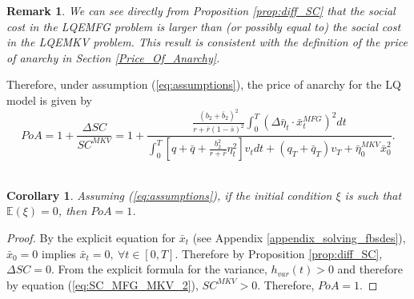 \documentclass[11pt]{article}
\newtheorem{remark}{Remark}
\newtheorem{corollary}{Corollary}
\begin{document}
\begin{remark}
	We can see directly from Proposition \ref{prop:diff_SC} that the social cost in the LQEMFG problem is larger than (or possibly equal to) the social cost in the LQEMKV problem. This result is consistent with the definition of the price of anarchy in Section \ref{Price_Of_Anarchy}.
\end{remark}

Therefore, under assumption (\ref{eq:assumptions}), the price of anarchy for the LQ model is given by 
\begin{equation}
PoA =1+ \frac{\Delta SC}{SC^{MKV}}= 1 +  \frac{ \displaystyle   \frac{(b_2 + \bar{b}_2)^2}{r + \bar{r}(1-\bar{s})^2}  \int_0^T (\Delta \bar{\eta}_t \cdot \bar{x}_t^{MFG})^2 dt }{\displaystyle \int_0^T \left[q+\bar{q} + \frac{b_2^2}{r+\bar{r}} \eta_t^2 \right] v_t dt + (q_T + \bar{q}_T) v_T + \bar{\eta}_0^{MKV} \bar{x}_0^2}.
\label{eq:PoA_LQ}
\end{equation}\\

\begin{corollary}
    Assuming (\ref{eq:assumptions}), if the initial condition $\xi$ is such that $\mathbb{E}(\xi)=0$, then $PoA=1$.
\end{corollary}
\begin{proof}
    By the explicit equation for $\bar{x}_t$ (see Appendix \ref{appendix_solving_fbsdes}), $\bar{x}_0=0$ implies $\bar{x}_t=0,\ \forall t \in [0,T]$. Therefore by Proposition \ref{prop:diff_SC}, $\Delta SC=0$. From the explicit formula for the variance, $h_{var}(t)>0$ and therefore by equation (\ref{eq:SC_MFG_MKV_2}), $SC^{MKV}>0$. Therefore, $PoA=1$.
\end{proof}
\end{document}
